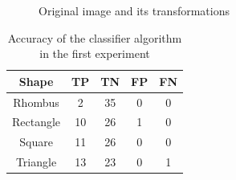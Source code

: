 \documentclass[10pt,journal]{IEEEtran}
\begin{document}
	\begin{figure}
	\centering
	\caption{Original image and its transformations}
	\label{fig:transform}
	\end{figure}
	
	\begin{table}
	\begin{center}
	\begin{tabular}{|c|c|c|c|c|}
		\hline
		Shape & TP & TN & FP & FN \\			
		\hline
		Rhombus & 2 & 35 & 0 & 0 \\
		Rectangle & 10 & 26 & 1 & 0 \\
		Square & 11 & 26 & 0 & 0 \\
		Triangle & 13 & 23 & 0 & 1 \\
		\hline
	\end{tabular}
	\end{center}
	\caption{Accuracy of the classifier algorithm in the first experiment}	
	\label{tb:result}
	\end{table}
	
	
	
\end{document}
